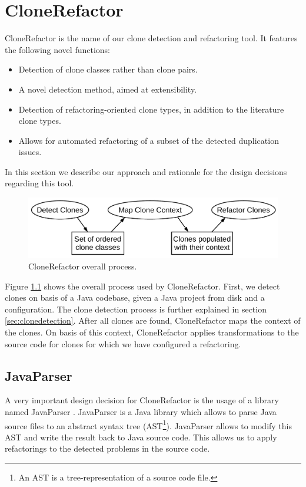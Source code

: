 \chapter{CloneRefactor} \label{ch:clonerefactor}
CloneRefactor is the name of our clone detection and refactoring tool. It features the following novel functions:
\begin{itemize}
  \item Detection of clone classes rather than clone pairs.
  \item A novel detection method, aimed at extensibility.
  \item Detection of refactoring-oriented clone types, in addition to the literature clone types.
  \item Allows for automated refactoring of a subset of the detected duplication issues.
\end{itemize}
In this section we describe our approach and rationale for the design decisions regarding this tool.

\begin{figure}[H]
  \centering
  \includegraphics[width=0.8\columnwidth]{img/CloneRefactorOverall}
  \caption{CloneRefactor overall process.}
  \label{fig:clonerefactorprocess}
\end{figure}

Figure \ref{fig:clonerefactorprocess} shows the overall process used by CloneRefactor. First, we detect clones on basis of a Java codebase, given a Java project from disk and a configuration. The clone detection process is further explained in section \ref{sec:clonedetection}. After all clones are found, CloneRefactor maps the context of the clones. On basis of this context, CloneRefactor applies transformations to the source code for clones for which we have configured a refactoring.

\section{JavaParser}
A very important design decision for CloneRefactor is the usage of a library named JavaParser \cite{tomassetti2017javaparser}. JavaParser is a Java library which allows to parse Java source files to an abstract syntax tree (AST\footnote{An AST is a tree-representation of a source code file.}). JavaParser allows to modify this AST and write the result back to Java source code. This allows us to apply refactorings to the detected problems in the source code.

